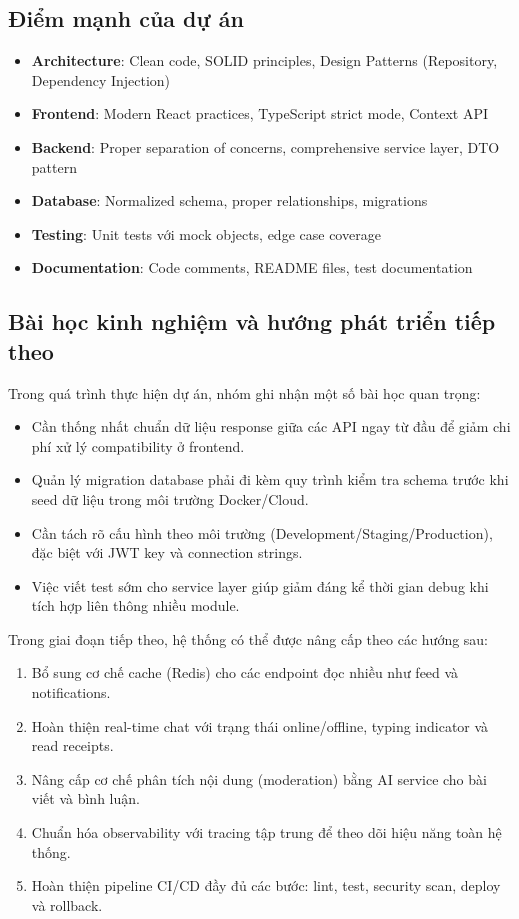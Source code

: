 \documentclass[a4paper]{article}
\begin{document}
    \subsection{Điểm mạnh của dự án}
    \begin{itemize}
        \item \textbf{Architecture}: Clean code, SOLID principles, Design Patterns (Repository, Dependency Injection)
        \item \textbf{Frontend}: Modern React practices, TypeScript strict mode, Context API
        \item \textbf{Backend}: Proper separation of concerns, comprehensive service layer, DTO pattern
        \item \textbf{Database}: Normalized schema, proper relationships, migrations
        \item \textbf{Testing}: Unit tests với mock objects, edge case coverage
        \item \textbf{Documentation}: Code comments, README files, test documentation
    \end{itemize}

    \subsection{Bài học kinh nghiệm và hướng phát triển tiếp theo}
    Trong quá trình thực hiện dự án, nhóm ghi nhận một số bài học quan trọng:
    \begin{itemize}
        \item Cần thống nhất chuẩn dữ liệu response giữa các API ngay từ đầu để giảm chi phí xử lý compatibility ở frontend.
        \item Quản lý migration database phải đi kèm quy trình kiểm tra schema trước khi seed dữ liệu trong môi trường Docker/Cloud.
        \item Cần tách rõ cấu hình theo môi trường (Development/Staging/Production), đặc biệt với JWT key và connection strings.
        \item Việc viết test sớm cho service layer giúp giảm đáng kể thời gian debug khi tích hợp liên thông nhiều module.
    \end{itemize}

    Trong giai đoạn tiếp theo, hệ thống có thể được nâng cấp theo các hướng sau:
    \begin{enumerate}
        \item Bổ sung cơ chế cache (Redis) cho các endpoint đọc nhiều như feed và notifications.
        \item Hoàn thiện real-time chat với trạng thái online/offline, typing indicator và read receipts.
        \item Nâng cấp cơ chế phân tích nội dung (moderation) bằng AI service cho bài viết và bình luận.
        \item Chuẩn hóa observability với tracing tập trung để theo dõi hiệu năng toàn hệ thống.
        \item Hoàn thiện pipeline CI/CD đầy đủ các bước: lint, test, security scan, deploy và rollback.
    \end{enumerate}
\end{document}
